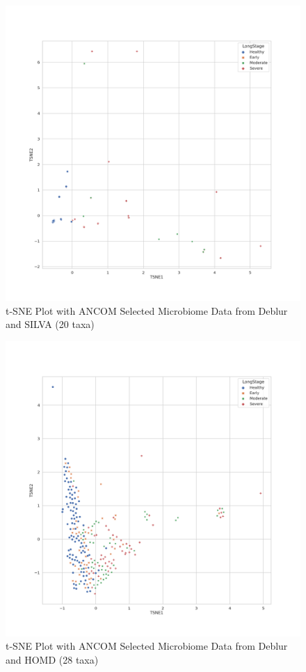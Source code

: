\documentclass[a4paper]{article}
\begin{document}
            \begin{figure}[p]
                \centering
                \includegraphics[width=0.6 \linewidth]{figures/tSNE/ANCOM/ANCOM.Deblur.silva.png}
                \caption{t-SNE Plot with ANCOM Selected Microbiome Data from Deblur and SILVA (20 taxa)}
                \label{fig:tsne-ANCOM-deblur-silva}
            \end{figure}

            \begin{figure}[p]
                \centering
                \includegraphics[width=0.6 \linewidth]{figures/tSNE/ANCOM/ANCOM.Deblur.homd.png}
                \caption{t-SNE Plot with ANCOM Selected Microbiome Data from Deblur and HOMD (28 taxa)}
                \label{fig:tsne-ANCOM-deblur-homd}
            \end{figure}
\end{document}
